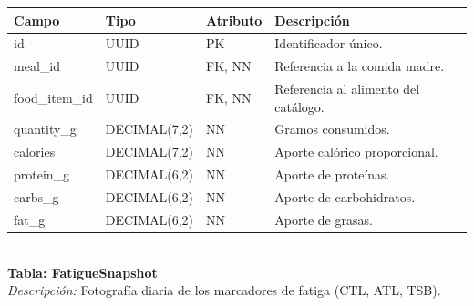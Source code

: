 \documentclass[12pt]{article}
\begin{document}
\begin{table}[h!]
    \centering
    \renewcommand{\arraystretch}{1.2}
    \small
    \begin{tabular}{|p{3.5cm}|p{2.7cm}|p{2cm}|p{6.5cm}|}
        \hline
        \rowcolor[HTML]{EFEFEF}
        \textbf{Campo} & \textbf{Tipo} & \textbf{Atributo} & \textbf{Descripción} \\ \hline
        id & UUID & PK & Identificador único. \\ \hline
        meal\_id & UUID & FK, NN & Referencia a la comida madre. \\ \hline
        food\_item\_id & UUID & FK, NN & Referencia al alimento del catálogo. \\ \hline
        quantity\_g & DECIMAL(7,2) & NN & Gramos consumidos. \\ \hline
        calories & DECIMAL(7,2) & NN & Aporte calórico proporcional. \\ \hline
        protein\_g & DECIMAL(6,2) & NN & Aporte de proteínas. \\ \hline
        carbs\_g & DECIMAL(6,2) & NN & Aporte de carbohidratos. \\ \hline
        fat\_g & DECIMAL(6,2) & NN & Aporte de grasas. \\ \hline
    \end{tabular}
\end{table}
\\
\noindent\textbf{Tabla: FatigueSnapshot} \\
\textit{Descripción:} Fotografía diaria de los marcadores de fatiga (CTL, ATL, TSB).
\end{document}
